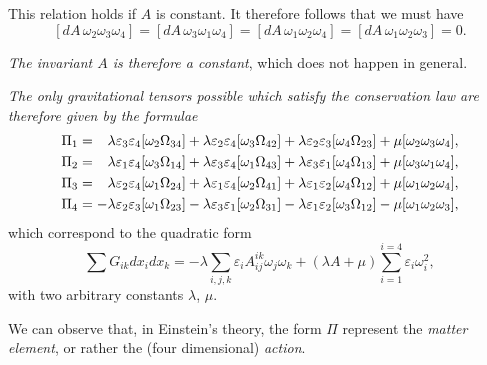 \documentclass[leqno,12pt]{article}
\makeatletter
\let\old@epsilon\epsilon
\let\old@varepsilon\varepsilon
\let\epsilon\old@varepsilon
\let\varepsilon\old@epsilon
\theoremstyle{shape1}
\theoremstyle{shape0}
\theoremstyle{shape2}
\theoremstyle{definition}
\makeatother
\begin{document}
This relation holds if $A$ is constant. It therefore follows that we must have
\[
[dA\,\omega_{2}\omega_{3}\omega_{4}]=[dA\,\omega_{3}\omega_{1}\omega_{4}]=[dA\,\omega_{1}\omega_{2}\omega_{4}]=[dA\,\omega_{1}\omega_{2}\omega_{3}]=0.
\]

\emph{The invariant $A$ is therefore a constant}, which does not happen in general.

\emph{The only gravitational tensors possible which satisfy the conservation law are therefore given by the formulae}
\begin{align*}
  \Pi_{1}&=\hphantom{+}\lambda\epsilon_{3}\epsilon_{4}[\omega_{2}\Omega_{34}]+\lambda\epsilon_{2}\epsilon_{4}[\omega_{3}\Omega_{42}]+\lambda\epsilon_{2}\epsilon_{3}[\omega_{4}\Omega_{23}]+\mu[\omega_{2}\omega_{3}\omega_{4}],\\
  \Pi_{2}&=\hphantom{+}\lambda\epsilon_{1}\epsilon_{4}[\omega_{3}\Omega_{14}]+\lambda\epsilon_{3}\epsilon_{4}[\omega_{1}\Omega_{43}]+\lambda\epsilon_{3}\epsilon_{1}[\omega_{4}\Omega_{13}]+\mu[\omega_{3}\omega_{1}\omega_{4}],\\
  \Pi_{3}&=\hphantom{+}\lambda\epsilon_{2}\epsilon_{4}[\omega_{1}\Omega_{24}]+\lambda\epsilon_{1}\epsilon_{4}[\omega_{2}\Omega_{41}]+\lambda\epsilon_{1}\epsilon_{2}[\omega_{4}\Omega_{12}]+\mu[\omega_{1}\omega_{2}\omega_{4}],\\
  \Pi_{4}&={-}\lambda\epsilon_{2}\epsilon_{3}[\omega_{1}\Omega_{23}]-\lambda\epsilon_{3}\epsilon_{1}[\omega_{2}\Omega_{31}]-\lambda\epsilon_{1}\epsilon_{2}[\omega_{3}\Omega_{12}]-\mu[\omega_{1}\omega_{2}\omega_{3}],\\
\end{align*}
which correspond to the quadratic form
\[
\sum G_{ik}dx_{i}dx_{k}=-\lambda\sum_{i,j,k}\epsilon_{i}A^{ik}_{ij}\omega_{j}\omega_{k}+(\lambda A+\mu)\sum_{i=1}^{i=4}\epsilon_{i}\omega_{i}^{2},
\]
with two arbitrary constants $\lambda$, $\mu$.

We can observe that, in Einstein's theory, the form $\Pi$ represent the \emph{matter element}, or rather the (four dimensional) \emph{action}.
\end{document}

